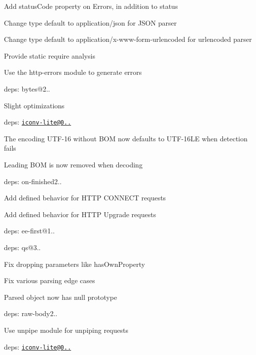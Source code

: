 \begin{DoxyItemize}
\item Add {\ttfamily status\+Code} property on {\ttfamily Error}s, in addition to {\ttfamily status}
\item Change {\ttfamily type} default to {\ttfamily application/json} for J\+S\+ON parser
\item Change {\ttfamily type} default to {\ttfamily application/x-\/www-\/form-\/urlencoded} for urlencoded parser
\item Provide static {\ttfamily require} analysis
\item Use the {\ttfamily http-\/errors} module to generate errors
\item deps\+: bytes@2..
\begin{DoxyItemize}
\item Slight optimizations
\end{DoxyItemize}
\item deps\+: \href{mailto:iconv-lite@0.4.10}{\tt iconv-\/lite@0..}
\begin{DoxyItemize}
\item The encoding U\+T\+F-\/16 without B\+OM now defaults to U\+T\+F-\/16\+LE when detection fails
\item Leading B\+OM is now removed when decoding
\end{DoxyItemize}
\item deps\+: on-\/finished2..
\begin{DoxyItemize}
\item Add defined behavior for H\+T\+TP {\ttfamily C\+O\+N\+N\+E\+CT} requests
\item Add defined behavior for H\+T\+TP {\ttfamily Upgrade} requests
\item deps\+: ee-\/first@1..
\end{DoxyItemize}
\item deps\+: qs@3..
\begin{DoxyItemize}
\item Fix dropping parameters like {\ttfamily has\+Own\+Property}
\item Fix various parsing edge cases
\item Parsed object now has {\ttfamily null} prototype
\end{DoxyItemize}
\item deps\+: raw-\/body2..
\begin{DoxyItemize}
\item Use {\ttfamily unpipe} module for unpiping requests
\item deps\+: \href{mailto:iconv-lite@0.4.10}{\tt iconv-\/lite@0..}

\end{DoxyItemize}
\end{DoxyItemize}
